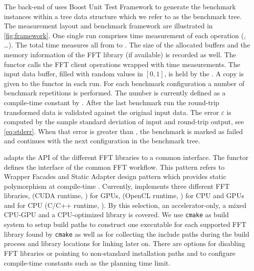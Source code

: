 The back-end of \gearshifft{} uses Boost Unit Test Framework to generate the benchmark instances within a tree data structure which we refer to as the benchmark tree.
The measurement layout and benchmark framework are illustrated in \cref{fig:framework}. One single run comprises time measurement of each operation (, \ldots). The total time measures all from  to . The size of the allocated buffers and the memory information of the FFT library (if available) is recorded as well. The functor  calls the FFT client operations wrapped with time measurements. The input data buffer, filled with random values in $[0,1]$, is held by the . A copy is given to the  functor in each run. For each benchmark configuration a number of benchmark repetitions is performed. The number is currently defined as a compile-time constant by . After the last benchmark run the round-trip transformed data is validated against the original input data. The error $\varepsilon$ is computed by the sample standard deviation of input and round-trip output, see \cref{eq:stderr}. When that error is greater than , the benchmark is marked as failed and \gearshifft{} continues with the next configuration in the benchmark tree.


\gearshifft{} adapts the API of the different FFT libraries to a common interface. The  functor defines the interface of the common FFT workflow. This pattern refers to Wrapper Facades and Static Adapter design pattern which provides static polymorphism at compile-time \cite{bachmann}.
Currently, \gearshifft{} implements three different FFT libraries, \cufft{} (CUDA runtime, \cite{nvidia2010cufft}) for \nvidia{} GPUs, \clfft{} (OpenCL runtime, \cite{clfft}) for CPU and GPUs and \fftw{} for CPU (C/C++ runtime, \cite{FFTW05}). By this selection, an accelerator-only, a mixed CPU-GPU and a CPU-optimized library is covered.
%
We use \texttt{cmake} as build system to setup build paths to construct one executable for each supported FFT library found by \texttt{cmake} as well as for collecting the include paths during the build process and library locations for linking later on. There are options for disabling FFT libraries or pointing to non-standard installation paths and to configure compile-time constants such as the \fftw{} planning time limit. 

